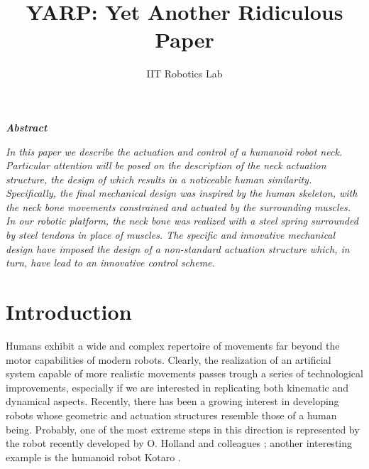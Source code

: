 \documentclass[9pt]{amsart}
\theoremstyle{definition}
\theoremstyle{remark}
\numberwithin{equation}{section}
\begin{document}
\title[YARP]{
YARP: Yet Another Ridiculous Paper}%
\author{IIT Robotics Lab}  %



\maketitle


\vspace{-0.2cm}
\begin{center}
{\emph{\textbf{Abstract}}}
\end{center}
\vspace{0.2cm}

\emph{In this paper we describe the actuation and control of a humanoid robot neck. Particular attention will be posed on the description of the neck actuation structure, the design of which results in a noticeable human similarity. Specifically, the final mechanical design was inspired by the human skeleton, with the neck bone movements constrained and actuated by the surrounding muscles. In our robotic platform, the neck bone was realized with a steel spring surrounded by steel tendons in place of muscles. The specific and innovative mechanical design have imposed the design of a non-standard actuation structure which, in turn, have lead to an innovative control scheme.} 




\section{Introduction}

Humans exhibit a wide and complex repertoire of movements far beyond the motor capabilities of modern robots. Clearly, the
realization of an artificial system capable of more realistic movements passes trough a series of technological improvements,
especially if we are interested in replicating both kinematic and dynamical aspects. Recently, there has been a growing interest in developing robots whose geometric and actuation structures resemble those of a human being. Probably, one of the most extreme steps in this direction is represented by the robot recently developed by O. Holland and colleagues \cite{Cronos}; another interesting example is the humanoid robot Kotaro \cite{Kotaro}.
\end{document}
